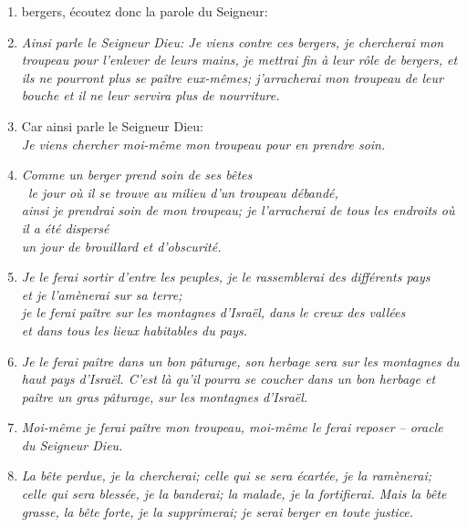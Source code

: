 \begin{enumerate}[leftmargin=\psleftmargin, labelsep = \pslabelsep, label={\arabic*}, font=\color{\pscolor}\small\textsuperscript, parsep=0em, itemsep=0em, topsep=0em ]
{          parce que mes bergers ne sont pas allés à la recherche de mon troupeau, \brk
          mais que ces bergers se paissaient eux-mêmes sans faire paître mon troupeau,} \verseSpace
  \item {}bergers, écoutez donc la parole du Seigneur:
  \item {}\textit{Ainsi parle le Seigneur Dieu: \brk
          Je viens contre ces bergers, \brk
          je chercherai mon troupeau pour l’enlever de leurs mains, \brk
          je mettrai fin à leur rôle de bergers, \brk
          et ils ne pourront plus se paître eux-mêmes; \brk
          j’arracherai mon troupeau de leur bouche \brk
          et il ne leur servira plus de nourriture.} \newpage
  \item {}Car ainsi parle le Seigneur Dieu: \\
        \textit{Je viens chercher moi-même mon troupeau pour en prendre soin.}
  \item {}\textit{Comme un berger prend soin de ses bêtes \\\
          le jour où il se trouve au milieu d’un troupeau débandé, \\
          \indentlvl{3}ainsi je prendrai soin de mon troupeau; \brk
          je l’arracherai de tous les endroits où il a été dispersé \\
          \indentlvl{4}un jour de brouillard et d’obscurité.}
  \item {}\textit{Je le ferai sortir d’entre les peuples, \brk
          je le rassemblerai des différents pays \\
          et je l’amènerai sur sa terre; \\
          je le ferai paître sur les montagnes d’Israël, \brk
          dans le creux des vallées \\
          et dans tous les lieux habitables du pays.}
  \item \indentlvl{3}\textit{Je le ferai paître dans un bon pâturage, \brk
          son herbage sera sur les montagnes du haut pays d’Israël.\brk
          C’est là qu’il pourra se coucher dans un bon herbage \brk
          et paître un gras pâturage, \brk
          sur les montagnes d’Israël.}
  \item {}\textit{Moi-même je ferai paître mon troupeau,\brk
          moi-même le ferai reposer – oracle du Seigneur Dieu.}
  \item {}\textit{La bête perdue, je la chercherai; \brk
          celle qui se sera écartée, je la ramènerai; \brk
          celle qui sera blessée, je la banderai; \brk
          la malade, je la fortifierai. \brk
          Mais la bête grasse, la bête forte, je la supprimerai; \brk
          je serai berger en toute justice.}\newpage



\end{enumerate}
